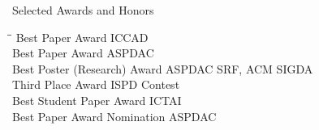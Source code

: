 
\begin{rSection}{Selected Awards and Honors}
\begin{tabbing}
\hspace{3.2in}\= \hspace{2.8in}\=\kill
    Best Paper Award                   \>ICCAD                         \\

    Best Paper Award                   \>ASPDAC                         \\

    Best Poster (Research) Award       \>ASPDAC SRF, ACM SIGDA        \\

    Third Place Award                  \>ISPD Contest        \\

    Best Student Paper Award           \>ICTAI                         \\

    Best Paper Award Nomination        \>ASPDAC                      

\end{tabbing}
\end{rSection}

